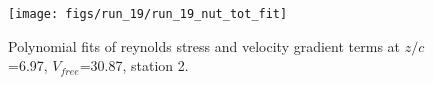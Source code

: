 \begin{figure}[H]
\centering
\texttt{[image: figs/run\_19/run\_19\_nut\_tot\_fit]}
\caption{Polynomial fits of reynolds stress and velocity gradient terms at $z/c$=6.97, $V_{free}$=30.87, station 2.}
\label{fig:run_19_nut_tot_fit}
\end{figure}


